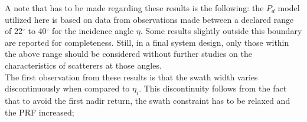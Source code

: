 \documentclass[conference,a4paper]{IEEEtran}
\begin{document}
    \begin{table}[t]
        \caption{Design examples results}
        \label{tab:analysis}
        \centering
        \large
    \end{table}
    A note that has to be made regarding these results is the following: the $P_d$ model utilized here is based on data from observations made between a declared range of 22$^\circ$ to 40$^\circ$ for the incidence angle $\eta$.
    Some results slightly outside this boundary are reported for completeness.
    Still, in a final system design, only those within the above range should be considered without further studies on the characteristics of scatterers at those angles.\\
    The first observation from these results is that the swath width varies discontinuously when compared to $\eta_i$.
    This discontinuity follows from the fact that to avoid the first nadir return, the swath constraint has to be relaxed and the PRF increased;
\end{document}
